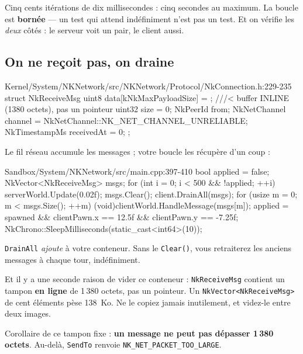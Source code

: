 Cinq cents itérations de dix millisecondes : cinq secondes au maximum. La boucle
est \textbf{bornée} — un test qui attend indéfiniment n'est pas un test. Et on
vérifie les \emph{deux} côtés : le serveur voit un pair, le client aussi.

\subsection{On ne reçoit pas, on draine}

\begin{nkcode}{Kernel/System/NKNetwork/src/NKNetwork/Protocol/NkConnection.h:229-235}
struct NkReceiveMsg {
        uint8 data[kNkMaxPayloadSize] = {};   ///< buffer INLINE (1380 octets), pas un pointeur
        uint32 size = 0;
        NkPeerId from;
        NkNetChannel channel = NkNetChannel::NK_NET_CHANNEL_UNRELIABLE;
        NkTimestampMs receivedAt = 0;
};
\end{nkcode}

Le fil réseau accumule les messages ; votre boucle les récupère d'un coup :

\begin{nkcode}{Sandbox/System/NKNetwork/src/main.cpp:397-410}
        bool applied = false;
        NkVector<NkReceiveMsg> msgs;
        for (int i = 0; i < 500 && !applied; ++i) {
            serverWorld.Update(0.02f);
            msgs.Clear();
            client.DrainAll(msgs);
            for (usize m = 0; m < msgs.Size(); ++m) {
                (void)clientWorld.HandleMessage(msgs[m]);
            }
            applied = spawned && clientPawn.x == 12.5f && clientPawn.y == -7.25f;
            NkChrono::SleepMilliseconds(static_cast<int64>(10));
        }
\end{nkcode}

\begin{nkpiege}
\texttt{DrainAll} \emph{ajoute} à votre conteneur. Sans le \texttt{Clear()},
vous retraiterez les anciens messages à chaque tour, indéfiniment.

Et il y a une seconde raison de vider ce conteneur : \texttt{NkReceiveMsg}
contient un tampon \textbf{en ligne} de 1\,380 octets, pas un pointeur. Un
\texttt{NkVector<NkReceiveMsg>} de cent éléments pèse 138~Ko. Ne le copiez
jamais inutilement, et videz-le entre deux images.
\end{nkpiege}

Corollaire de ce tampon fixe : \textbf{un message ne peut pas dépasser
1\,380 octets}. Au-delà, \texttt{SendTo} renvoie
\texttt{NK\_NET\_PACKET\_TOO\_LARGE}.


